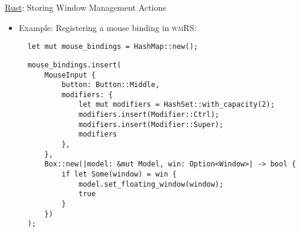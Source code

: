 \begin{frame}[fragile]{\underline{Rust}: Storing Window Management Actions \hfill {\footnotesize \currentname}}


    \begin{itemize}

        \item Example: Registering a mouse binding in \textsc{wmRS}:\\[3pt] 
\begin{verbatim}
  let mut mouse_bindings = HashMap::new();
\end{verbatim}
\begin{verbatim}
  mouse_bindings.insert(
      MouseInput {
          button: Button::Middle,
          modifiers: {
              let mut modifiers = HashSet::with_capacity(2);
              modifiers.insert(Modifier::Ctrl);
              modifiers.insert(Modifier::Super);
              modifiers
          },
      },
      Box::new(|model: &mut Model, win: Option<Window>| -> bool {
          if let Some(window) = win {
              model.set_floating_window(window);
              true
          }
      })
  );
\end{verbatim}

    \end{itemize}

    \vfill

\end{frame}



